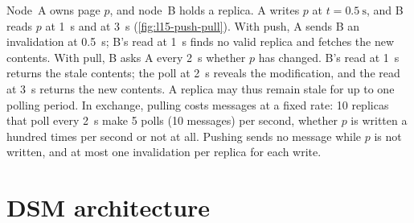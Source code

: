 \documentclass[../main.tex]{subfiles}
\begin{document}
\begin{example}
  Node~A owns page $p$, and node~B holds a replica.  A writes $p$ at
  $t=\SI{0.5}{\second}$, and B reads $p$ at \SI{1}{\second} and at
  \SI{3}{\second} (\cref{fig:l15-push-pull}).  With push, A sends B an
  invalidation at \SI{0.5}{\second}; B's read at \SI{1}{\second} finds no
  valid replica and fetches the new contents.  With pull, B asks A every
  \SI{2}{\second} whether $p$ has changed.  B's read at \SI{1}{\second}
  returns the stale contents; the poll at \SI{2}{\second} reveals the
  modification, and the read at \SI{3}{\second} returns the new contents.
  A replica may thus remain stale for up to one polling period.  In
  exchange, pulling costs messages at a fixed rate: 10 replicas that poll
  every \SI{2}{\second} make 5 polls (10 messages) per second, whether $p$ is written
  a hundred times per second or not at all.  Pushing sends no message while
  $p$ is not written, and at most one invalidation per replica for each
  write.
\end{example}

\section{DSM architecture}
\label{sec:l15-architecture}
\end{document}
